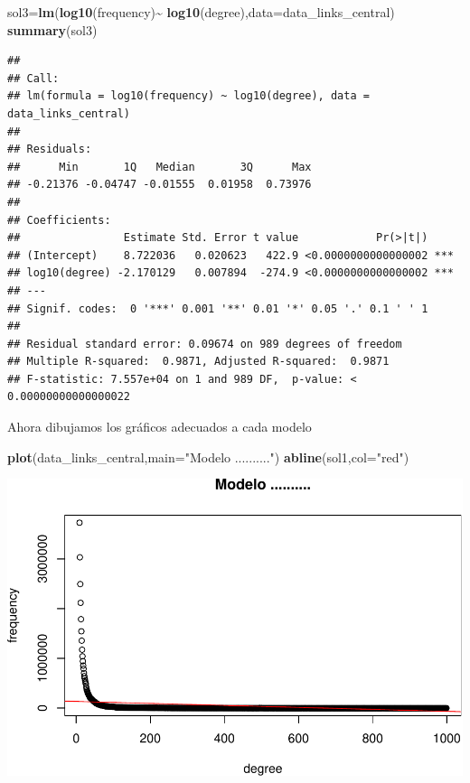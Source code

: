\documentclass[
]{article}
\newenvironment{Shaded}{\begin{snugshade}}{\end{snugshade}}
\newcommand{\DataTypeTok}[1]{\textcolor[rgb]{0.13,0.29,0.53}{#1}}
\newcommand{\KeywordTok}[1]{\textcolor[rgb]{0.13,0.29,0.53}{\textbf{#1}}}
\newcommand{\NormalTok}[1]{#1}
\newcommand{\OperatorTok}[1]{\textcolor[rgb]{0.81,0.36,0.00}{\textbf{#1}}}
\newcommand{\StringTok}[1]{\textcolor[rgb]{0.31,0.60,0.02}{#1}}
\begin{document}
\begin{Shaded}
\begin{Highlighting}[]
\NormalTok{sol3=}\KeywordTok{lm}\NormalTok{(}\KeywordTok{log10}\NormalTok{(frequency)}\OperatorTok{\textasciitilde{}}\StringTok{ }\KeywordTok{log10}\NormalTok{(degree),}\DataTypeTok{data=}\NormalTok{data\_links\_central)}
\KeywordTok{summary}\NormalTok{(sol3)}
\end{Highlighting}
\end{Shaded}

\begin{verbatim}
## 
## Call:
## lm(formula = log10(frequency) ~ log10(degree), data = data_links_central)
## 
## Residuals:
##      Min       1Q   Median       3Q      Max 
## -0.21376 -0.04747 -0.01555  0.01958  0.73976 
## 
## Coefficients:
##                Estimate Std. Error t value            Pr(>|t|)    
## (Intercept)    8.722036   0.020623   422.9 <0.0000000000000002 ***
## log10(degree) -2.170129   0.007894  -274.9 <0.0000000000000002 ***
## ---
## Signif. codes:  0 '***' 0.001 '**' 0.01 '*' 0.05 '.' 0.1 ' ' 1
## 
## Residual standard error: 0.09674 on 989 degrees of freedom
## Multiple R-squared:  0.9871, Adjusted R-squared:  0.9871 
## F-statistic: 7.557e+04 on 1 and 989 DF,  p-value: < 0.00000000000000022
\end{verbatim}

Ahora dibujamos los gráficos adecuados a cada modelo

\begin{Shaded}
\begin{Highlighting}[]
\KeywordTok{plot}\NormalTok{(data\_links\_central,}\DataTypeTok{main=}\StringTok{"Modelo .........."}\NormalTok{)}
\KeywordTok{abline}\NormalTok{(sol1,}\DataTypeTok{col=}\StringTok{"red"}\NormalTok{)}
\end{Highlighting}
\end{Shaded}

\includegraphics{taller_problemas_resueltos_extra_1_files/figure-latex/unnamed-chunk-53-1.pdf}
\end{document}
